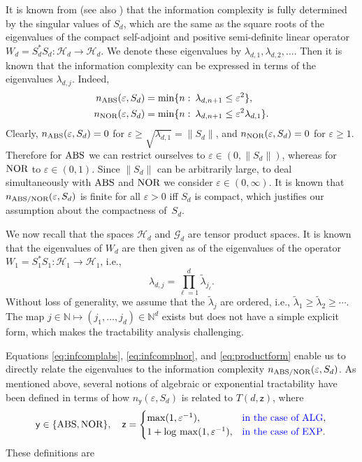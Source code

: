 \documentclass[graybox]{svmult}
\newcommand{\tlambda}{\widetilde{\lambda}}
\newcommand{\naturals}{\mathbb{N}}
\newcommand{\NOR}{\textup{NOR}\xspace}
\newcommand{\ABS}{\textup{ABS}\xspace}
\newcommand{\calG}{{\mathcal{G}}}
\newcommand{\calH}{{\mathcal{H}}}
\newcommand{\pk}[1]{{\color{blue}{#1}}}
\begin{document}
It is known from \cite{TWW88} (see also \cite{NW08})   
that the information complexity is fully determined by    
the singular values of $S_d$, which    
are the same as the square roots of the eigenvalues of    
the compact self-adjoint and positive semi-definite   
linear   
operator $W_d=S_d^\ast S_d:\calH_d\rightarrow\calH_d$.    
We denote these eigenvalues by $\lambda_{d,1}, \lambda_{d,2},\ldots$. Then it is known that 
the information complexity can be expressed in terms of the eigenvalues $\lambda_{d,j}$. Indeed, 
\begin{align}   
n_{\ABS}(\varepsilon, S_d)   
&=\min\{n\,\colon\,\lambda_{d,n+1}\le   
\varepsilon^2\},
\label{eq:infcomplabs}\\   
n_{\NOR}(\varepsilon, S_d)&=   
\min\{n\,\colon\,\lambda_{d,n+1}\le \varepsilon^2 \lambda_{d,1}\}. 
\label{eq:infcomplnor}     
\end{align}
Clearly,    
$n_{\ABS}(\varepsilon, S_d)=0$ for $\varepsilon\ge   
\sqrt{\lambda_{d,1}}=\|S_d\|$, and    
$n_{\NOR}(\varepsilon, S_d)=0$ for $\varepsilon\ge1$.   
Therefore for $\ABS$ we can restrict ourselves to $\varepsilon\in(0,\|S_d\|)$,   
whereas for $\NOR$ to $\varepsilon\in(0,1)$.   
Since $\|S_d\|$ can be arbitrarily large, to deal simultaneously    
with $\ABS$ and $\NOR$ we consider $\varepsilon\in(0,\infty)$.    
It is known that $n_{\ABS/\NOR}(\varepsilon,S_d)$ is finite for all   
$\varepsilon>0$ iff $S_d$ is compact, which justifies our assumption   
about the compactness of~$S_d$.   

We now recall that the spaces $\calH_d$ and $\calG_d$ are tensor product
spaces. It is known that the eigenvalues of $W_d$ are then given as \pk{products} 
of the eigenvalues of the operator $W_1=S_1^\ast S_1:\calH_1\rightarrow\calH_1$, i.e.,
\begin{equation}\label{eq:productform}
\lambda_{d,j}=\prod_{\ell=1}^d \tlambda_{j_\ell}.
\end{equation}
Without loss of generality, we assume that the $\tlambda_j$ are ordered, i.e., $\tlambda_1\ge \tlambda_2 \ge \cdots$. 
The map $j \in \naturals \mapsto (j_1, \ldots, j_d) \in \naturals^d$ exists but does not have a simple explicit form, which makes the tractability analysis challenging.
   
Equations \eqref{eq:infcomplabs}, \eqref{eq:infcomplnor}, and \eqref{eq:productform} enable us to directly relate the 
eigenvalues \pk{$\tlambda_{j}$} to the information complexity $n_{\ABS/\NOR}(\varepsilon, S_d)$. 
As mentioned above, several notions of algebraic or exponential tractability have been defined in terms of how $n_{\mathsf{y}}(\varepsilon, S_d)$ is related to $T(d,\mathsf{z})$, where 
\begin{equation*}
\mathsf{y} \in \{\ABS, \NOR \}, \quad
\mathsf{z} = \begin{cases} \max(1,\varepsilon^{-1}), & \pk{\mbox{in the case of ALG}}, \\
1+\log\, \max(1,\varepsilon^{-1}), & \pk{\mbox{in the case of EXP}}.\end{cases}
\end{equation*}
These definitions are \pk{as follows.}
\end{document}

